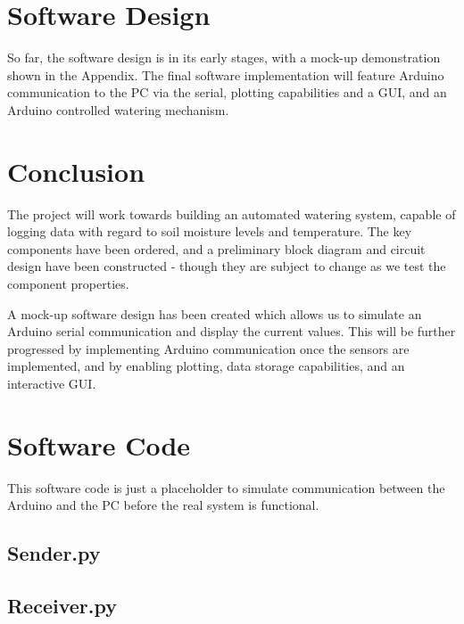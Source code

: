 \documentclass[a4paper,11pt]{article}
\begin{document}
\section{Software Design}
\label{sec:Software_Design}


So far, the software design is in its early stages,
with a mock-up demonstration shown in the Appendix.
The final software implementation will feature 
Arduino communication to the PC via the serial,
plotting capabilities and a GUI,
and an Arduino controlled watering mechanism.

\section{Conclusion}
\label{sec:Conclusion}

The project will work towards building an automated watering system,
capable of logging data with regard to soil moisture levels and temperature.
The key components have been ordered, 
and a preliminary block diagram and circuit design have been constructed - 
though they are subject to change as we test the component properties.

A mock-up software design has been created which allows us to 
simulate an Arduino serial communication and display the current values.
This will be further progressed by implementing 
Arduino communication once the sensors are implemented,
and by enabling plotting, data storage capabilities, and an interactive GUI.

\newpage
\appendix
\section{Software Code}
This software code is just a placeholder to simulate
communication between the Arduino and the PC
before the real system is functional.

\subsection{Sender.py}



\subsection{Receiver.py}


\end{document}
